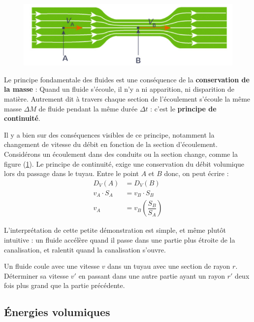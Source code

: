 \documentclass[11pt,a4paper]{article}
\begin{document}
\begin{figure}
\centering
\includegraphics[width=0.95\linewidth]{imgs/p9/tubechange.jpg}
\caption{}
\label{fig:tubechange}
\end{figure}
Le principe fondamentale des fluides est une conséquence de la \textbf{conservation de la masse} : Quand un fluide s’écoule, il n’y a ni apparition, ni disparition de matière. Autrement dit à travers chaque section de l’écoulement s’écoule la même masse $\Delta M$ de fluide pendant la même durée $\Delta t$ : c'est le \textbf{principe de continuité}. 


Il y a bien sur des conséquences visibles de ce principe, notamment la changement de vitesse du débit en fonction de la section d'écoulement. Considérons un écoulement dans des conduits ou la section change, comme la figure (\ref{fig:tubechange}). Le principe de continuité, exige une conservation du débit volumique lors du passage dans le tuyau. Entre le point $A$ et $B$ donc, on peut écrire : 
\begin{align*}
    D_V(A) &= D_V(B) \\
    v_A\cdot S_A &= v_B\cdot S_B \\
    v_A &= v_B\left(\dfrac{S_B}{S_A} \right)
\end{align*}

L'interprétation de cette petite démonstration est simple, et même plutôt intuitive : un fluide accélère quand il passe dans une partie plus étroite de la canalisation, et ralentit quand la canalisation s'ouvre. 

\begin{exo}
Un fluide coule avec une vitesse $v$ dans un tuyau avec une section de rayon $r$. Déterminer sa vitesse $v'$ en passant dans une autre partie ayant un rayon $r'$ deux fois plus grand que la partie précédente. 
\vspace{3cm}
\end{exo}

\subsection{Énergies volumiques}
\end{document}
